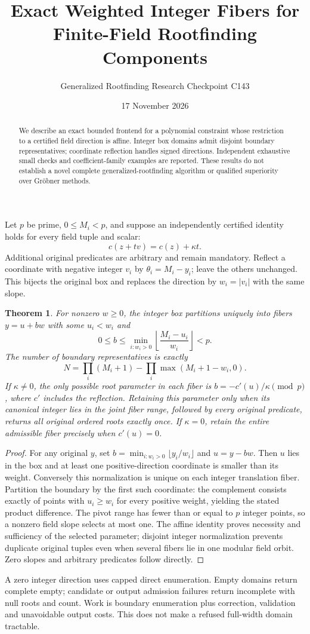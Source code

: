 \documentclass[11pt]{article}
\title{Exact Weighted Integer Fibers for Finite-Field Rootfinding Components}
\author{Generalized Rootfinding Research Checkpoint C143}
\date{17 November 2026}
\newtheorem{theorem}{Theorem}
\begin{document}
\maketitle
\begin{abstract}
We describe an exact bounded frontend for a polynomial constraint whose restriction to a certified field direction is affine. Integer box domains admit disjoint boundary representatives; coordinate reflection handles signed directions. Independent exhaustive small checks and coefficient-family examples are reported. These results do not establish a novel complete generalized-rootfinding algorithm or qualified superiority over Gr\"obner methods.
\end{abstract}
Let $p$ be prime, $0\le M_i<p$, and suppose an independently certified identity holds for every field tuple and scalar:
\[c(z+t v)=c(z)+\kappa t.\]
Additional original predicates are arbitrary and remain mandatory. Reflect a coordinate with negative integer $v_i$ by $\theta_i=M_i-y_i$; leave the others unchanged. This bijects the original box and replaces the direction by $w_i=|v_i|$ with the same slope.
\begin{theorem}
For nonzero $w\ge0$, the integer box partitions uniquely into fibers $y=u+bw$ with some $u_i<w_i$ and
\[0\le b\le\min_{i:w_i>0}\left\lfloor\frac{M_i-u_i}{w_i}\right\rfloor<p.\]
The number of boundary representatives is exactly
\[N=\prod_i(M_i+1)-\prod_i\max(M_i+1-w_i,0).\]
If $\kappa\ne0$, the only possible root parameter in each fiber is $b=-c'(u)/\kappa\pmod p$, where $c'$ includes the reflection. Retaining this parameter only when its canonical integer lies in the joint fiber range, followed by every original predicate, returns all original ordered roots exactly once. If $\kappa=0$, retain the entire admissible fiber precisely when $c'(u)=0$.
\end{theorem}
\begin{proof}
For any original $y$, set $b=\min_{i:w_i>0}\lfloor y_i/w_i\rfloor$ and $u=y-bw$. Then $u$ lies in the box and at least one positive-direction coordinate is smaller than its weight. Conversely this normalization is unique on each integer translation fiber. Partition the boundary by the first such coordinate: the complement consists exactly of points with $u_i\ge w_i$ for every positive weight, yielding the stated product difference. The pivot range has fewer than or equal to $p$ integer points, so a nonzero field slope selects at most one. The affine identity proves necessity and sufficiency of the selected parameter; disjoint integer normalization prevents duplicate original tuples even when several fibers lie in one modular field orbit. Zero slopes and arbitrary predicates follow directly.
\end{proof}
A zero integer direction uses capped direct enumeration. Empty domains return complete empty; candidate or output admission failures return incomplete with null roots and count. Work is boundary enumeration plus correction, validation and unavoidable output costs. This does not make a refused full-width domain tractable.
\end{document}
